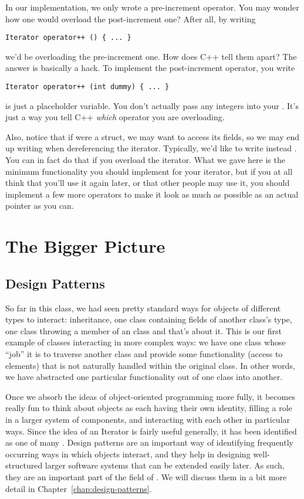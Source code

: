 \smallskip

In our implementation, we only wrote a pre-increment operator. You may
wonder how one would overload the post-increment one? After all, by
writing 
\begin{verbatim}
Iterator operator++ () { ... }
\end{verbatim}
we'd be overloading the pre-increment one. How does C++ tell them
apart? The answer is basically a hack. To implement the post-increment
operator, you write
\begin{verbatim}
Iterator operator++ (int dummy) { ... }
\end{verbatim}
 is just a placeholder variable. You don't actually pass
any integers into your . It's just a way you tell C++
\emph{which} operator you are overloading.

Also, notice that if  were a struct, we may want to access its
fields, so we may end up writing  when
dereferencing the iterator. Typically, we'd like to write instead
. You can in fact do that if you overload the
\code{->} iterator. What we gave here is the minimum functionality you
should implement for your iterator, but if you at all think that
you'll use it again later, or that other people may use it, you should
implement a few more operators to make it look as much as possible as
an actual pointer as you can.

\section{The Bigger Picture}
\subsection{Design Patterns}
So far in this class, we had seen pretty standard ways for objects of
different types to interact: inheritance, one class containing fields
of another class's type, one class throwing a member of an
 class and that's about it.
This is our first example of classes interacting in more complex ways:
we have one class whose ``job'' it is to traverse another class and
provide some functionality (access to elements) that is not naturally
handled within the original class. In other words, we have abstracted
one particular functionality out of one class into another.

Once we absorb the ideas of object-oriented programming more fully, it
becomes really fun to think about objects as each having their own
identity, filling a role in a larger system of components, and
interacting with each other in particular ways.
Since the idea of an Iterator is fairly useful generally, it has been
identified as one of many .
Design patterns are an important way of identifying frequently
occurring ways in which objects interact, and they help in designing
well-structured larger software systems that can be extended easily
later. As such, they are an important part of the field of
.
We will discuss them in a bit more detail in
Chapter~\ref{chap:design-patterns}. 

